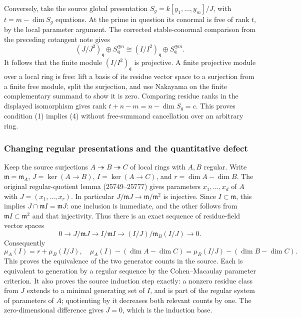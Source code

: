 Conversely, take the source global presentation \(S_g=k[y_1,\ldots,y_m]/J\), with \(t=m-\dim S_g\) equations. At the prime in question its conormal is free of rank \(t\), by the local parameter argument. The corrected stable-conormal comparison from the preceding cotangent note gives \[
(J/J^2)_{\mathfrak q}\oplus S_{\mathfrak q}^{\oplus n}
\cong (I/I^2)_{\mathfrak q}\oplus S_{\mathfrak q}^{\oplus m}.
\] It follows that the finite module \((I/I^2)_{\mathfrak q}\) is projective. A finite projective module over a local ring is free: lift a basis of its residue vector space to a surjection from a finite free module, split the surjection, and use Nakayama on the finite complementary summand to show it is zero. Comparing residue ranks in the displayed isomorphism gives rank \(t+n-m=n-\dim S_g=c\). This proves condition (1) implies (4) without free-summand cancellation over an arbitrary ring.

\subsubsection{Changing regular presentations and the quantitative defect}\label{algebra-proof-045-changing-regular-presentations-and-the-quantitative-defect}

Keep the source surjections \(A\twoheadrightarrow B\twoheadrightarrow C\) of local rings with \(A,B\) regular. Write \(\mathfrak m=\mathfrak m_A\), \(J=\ker(A\to B)\), \(I=\ker(A\to C)\), and \(r=\dim A-\dim B\). The original regular-quotient lemma (25749--25777) gives parameters \(x_1,\ldots,x_d\) of \(A\) with \(J=(x_1,\ldots,x_r)\). In particular \(J/\mathfrak mJ\to\mathfrak m/\mathfrak m^2\) is injective. Since \(I\subset\mathfrak m\), this implies \(J\cap\mathfrak mI=\mathfrak mJ\): one inclusion is immediate, and the other follows from \(\mathfrak mI\subset\mathfrak m^2\) and that injectivity. Thus there is an exact sequence of residue-field vector spaces \[
0\to J/\mathfrak mJ\to I/\mathfrak mI
\to (I/J)/\mathfrak m_B(I/J)\to0.
\tag{1}
\] Consequently \[
\mu_A(I)=r+\mu_B(I/J),\quad
\mu_A(I)-(\dim A-\dim C)
=\mu_B(I/J)-(\dim B-\dim C).\tag{2}
\] This proves the equivalence of the two generator counts in the source. Each is equivalent to generation by a regular sequence by the Cohen--Macaulay parameter criterion. It also proves the source induction step exactly: a nonzero residue class from \(J\) extends to a minimal generating set of \(I\), and is part of the regular system of parameters of \(A\); quotienting by it decreases both relevant counts by one. The zero-dimensional difference gives \(J=0\), which is the induction base.

